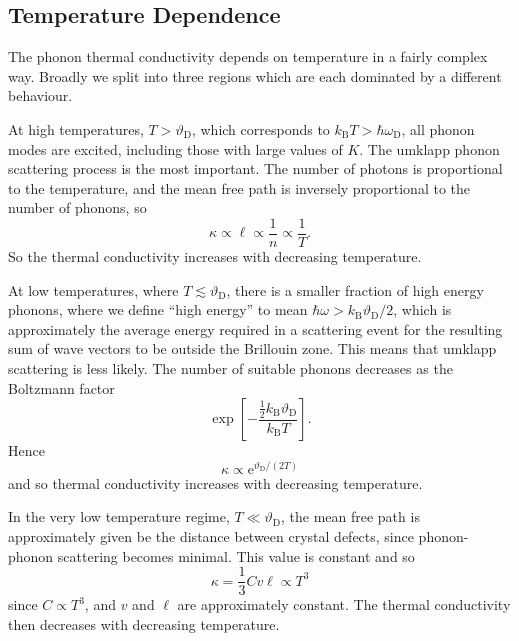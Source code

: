 \documentclass[fleqn]{NotesClass}
\newcommand*{\boltzmann}{k_{\mathrm{B}}}
\newcommand*{\e}{\mathrm{e}}
\newcommand*{\debye}{\mathrm{D}}
\begin{document}
    \subsection{Temperature Dependence}
    The phonon thermal conductivity depends on temperature in a fairly complex way.
    Broadly we split into three regions which are each dominated by a different behaviour.
    
    At high temperatures, \(T > \vartheta_{\debye}\), which corresponds to \(\boltzmann  T > \hbar\omega_{\debye}\), all phonon modes are excited, including those with large values of \(K\).
    The umklapp phonon scattering process is the most important.
    The number of photons is proportional to the temperature, and the mean free path is inversely proportional to the number of phonons, so
    \begin{equation}
        \kappa \propto \ell \propto \frac{1}{n} \propto \frac{1}{T}.
    \end{equation}
    So the thermal conductivity increases with decreasing temperature.
    
    At low temperatures, where \(T \lesssim \vartheta_{\debye}\), there is a smaller fraction of high energy phonons, where we define \enquote{high energy} to mean \(\hbar\omega > \boltzmann \vartheta_{\debye}/2\), which is approximately the average energy required in a scattering event for the resulting sum of wave vectors to be outside the Brillouin zone.
    This means that umklapp scattering is less likely.
    The number of suitable phonons decreases as the Boltzmann factor
    \begin{equation}
        \exp\left[ -\frac{\frac{1}{2}\boltzmann \vartheta_{\debye}}{\boltzmann  T} \right].
    \end{equation}
    Hence
    \begin{equation}
        \kappa \propto \e^{\vartheta_{\debye}/(2T)}
    \end{equation}
    and so thermal conductivity increases with decreasing temperature.
    
    In the very low temperature regime, \(T \ll \vartheta_{\debye}\), the mean free path is approximately given be the distance between crystal defects, since phonon-phonon scattering becomes minimal.
    This value is constant and so
    \begin{equation}
        \kappa = \frac{1}{3}Cv\ell \propto T^3
    \end{equation}
    since \(C\propto T^3\), and \(v\) and \(\ell\) are approximately constant.
    The thermal conductivity then decreases with decreasing temperature.
    
\end{document}

